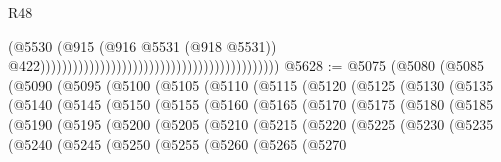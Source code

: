\begin{lexlean}{R48}
\begin{coremodule}
                                                                                        (@5530
                                                                                          (@915
                                                                                            (@916
                                                                                              @5531
                                                                                              (@918
                                                                                                @5531))
                                                                                            @422))))))))))))))))))))))))))))))))))))))))))))
@5628 := @5075
    (@5080
      (@5085
        (@5090
          (@5095
            (@5100
              (@5105
                (@5110
                  (@5115
                    (@5120
                      (@5125
                        (@5130
                          (@5135
                            (@5140
                              (@5145
                                (@5150
                                  (@5155
                                    (@5160
                                      (@5165
                                        (@5170
                                          (@5175
                                            (@5180
                                              (@5185
                                                (@5190
                                                  (@5195
                                                    (@5200
                                                      (@5205
                                                        (@5210
                                                          (@5215
                                                            (@5220
                                                              (@5225
                                                                (@5230
                                                                  (@5235
                                                                    (@5240
                                                                      (@5245
                                                                        (@5250
                                                                          (@5255
                                                                            (@5260
                                                                              (@5265
                                                                                (@5270

\end{coremodule}
\end{lexlean}
